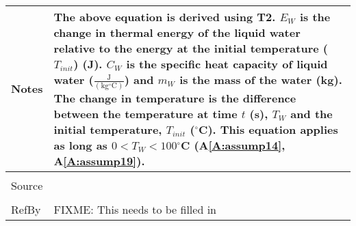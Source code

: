 \documentclass[12pt]{article}
\begin{document}
\begin{minipage}{\textwidth}
\begin{tabular}{p{} p{}}
Notes & The above equation is derived using T2. ${E_{W}}$ is the change in thermal energy of the liquid water relative to the energy at the initial temperature (${T_{init}}$) (J). ${C_{W}}$ is the specific heat capacity of liquid water ($\frac{\text{J}}{(\text{kg}{}^{\circ}\text{C})}$) and ${m_{W}}$ is the mass of the water (kg). The change in temperature is the difference between the temperature at time $t$ (s), ${T_{W}}$ and the initial temperature, ${T_{init}}$ (${}^{\circ}$C). This equation applies as long as $0<{T_{W}}<100$${}^{\circ}$C (A\ref{A:assump14}, A\ref{A:assump19}).
\\ \midrule \\
Source & 
\\ \midrule \\
RefBy & FIXME: This needs to be filled in
\\ \bottomrule \end{tabular}
\end{minipage}\\
\end{document}
